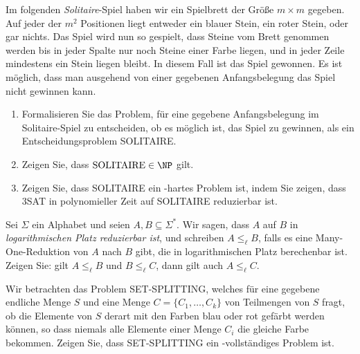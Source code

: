 \documentclass[german]{latteachCD}[2017/03/28]
\begin{document}
\begin{exercise}
  Im folgenden \emph{Solitaire}-Spiel haben wir ein Spielbrett der Größe $m
  \times m$ gegeben.  Auf jeder der $m^{2}$ Positionen liegt entweder ein blauer
  Stein, ein roter Stein, oder gar nichts.  Das Spiel wird nun so gespielt, dass
  Steine vom Brett genommen werden bis in jeder Spalte nur noch Steine einer
  Farbe liegen, und in jeder Zeile mindestens ein Stein liegen bleibt.  In
  diesem Fall ist das Spiel gewonnen.  Es ist möglich, dass man ausgehend von
  einer gegebenen Anfangsbelegung das Spiel nicht gewinnen kann.

  \begin{enumerate}
  \item Formalisieren Sie das Problem, für eine gegebene Anfangsbelegung im
    Solitaire-Spiel zu entscheiden, ob es möglich ist, das Spiel zu gewinnen,
    als ein Entscheidungsproblem SOLITAIRE.
  \item Zeigen Sie, dass $\text{SOLITAIRE} \in \NP$ gilt.
  \item Zeigen Sie, dass SOLITAIRE ein \NP-hartes Problem ist, indem Sie zeigen,
    dass 3SAT in polynomieller Zeit auf SOLITAIRE reduzierbar ist.
  \end{enumerate}
\end{exercise}

\begin{exercise}
  Sei $\Sigma$ ein Alphabet und seien $A, B \subseteq \Sigma^{*}$.  Wir sagen,
  dass $A$ auf $B$ in \emph{logarithmischen Platz reduzierbar ist}, und
  schreiben $A \leq_{\ell} B$, falls es eine Many-One-Reduktion von $A$ nach $B$
  gibt, die in logarithmischen Platz berechenbar ist.  Zeigen Sie: gilt $A
  \leq_{\ell} B$ und $B \leq_{\ell} C$, dann gilt auch $A \leq_{\ell} C$.
\end{exercise}

\begin{exercise}
  Wir betrachten das Problem SET-SPLITTING, welches für eine gegebene endliche
  Menge $S$ und eine Menge $C = \{C_{1}, \dots, C_{k}\}$ von Teilmengen von $S$
  fragt, ob die Elemente von $S$ derart mit den Farben blau oder rot gefärbt
  werden können, so dass niemals alle Elemente einer Menge $C_{i}$ die gleiche
  Farbe bekommen.  Zeigen Sie, dass SET-SPLITTING ein \NP-vollständiges Problem
  ist.
\end{exercise}
\end{document}
